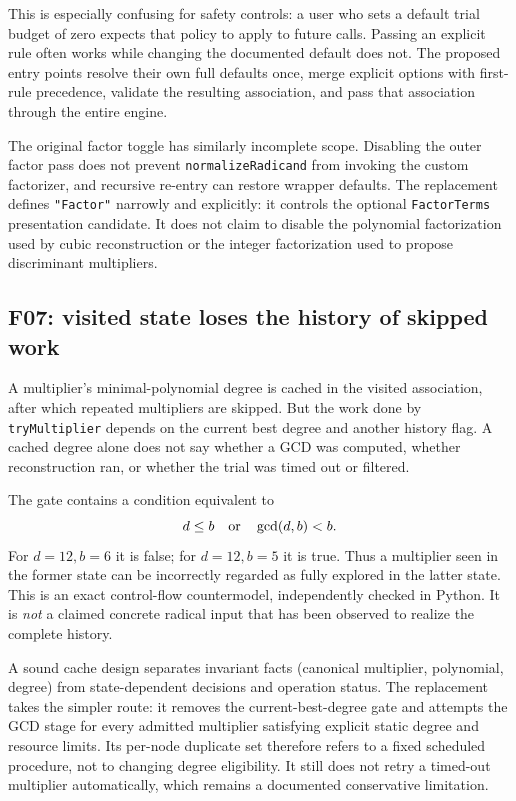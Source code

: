 \documentclass[11pt,letterpaper]{article}
\newcommand{\code}[1]{\texttt{#1}}
\theoremstyle{definition}
\begin{document}
This is especially confusing for safety controls: a user who sets a default trial budget of zero expects that policy to apply to future calls. Passing an explicit rule often works while changing the documented default does not. The proposed entry points resolve their own full defaults once, merge explicit options with first-rule precedence, validate the resulting association, and pass that association through the entire engine.

The original factor toggle has similarly incomplete scope. Disabling the outer factor pass does not prevent \code{normalizeRadicand} from invoking the custom factorizer, and recursive re-entry can restore wrapper defaults. The replacement defines \code{"Factor"} narrowly and explicitly: it controls the optional \code{FactorTerms} presentation candidate. It does not claim to disable the polynomial factorization used by cubic reconstruction or the integer factorization used to propose discriminant multipliers.

\subsection{F07: visited state loses the history of skipped work}

A multiplier's minimal-polynomial degree is cached in the visited association, after which repeated multipliers are skipped. But the work done by \code{tryMultiplier} depends on the current best degree and another history flag. A cached degree alone does not say whether a GCD was computed, whether reconstruction ran, or whether the trial was timed out or filtered.

The gate contains a condition equivalent to
\[
 d\le b\quad\hbox{or}\quad\gcd(d,b)<b.
\]
For $d=12,b=6$ it is false; for $d=12,b=5$ it is true. Thus a multiplier seen in the former state can be incorrectly regarded as fully explored in the latter state. This is an exact control-flow countermodel, independently checked in Python. It is \emph{not} a claimed concrete radical input that has been observed to realize the complete history.

A sound cache design separates invariant facts (canonical multiplier, polynomial, degree) from state-dependent decisions and operation status. The replacement takes the simpler route: it removes the current-best-degree gate and attempts the GCD stage for every admitted multiplier satisfying explicit static degree and resource limits. Its per-node duplicate set therefore refers to a fixed scheduled procedure, not to changing degree eligibility. It still does not retry a timed-out multiplier automatically, which remains a documented conservative limitation.
\end{document}
